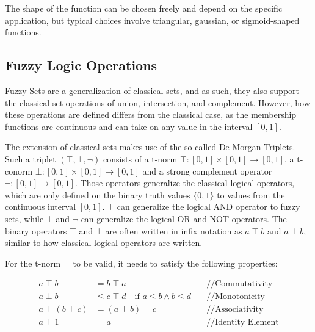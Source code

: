 The shape of the function can be chosen freely and depend on the specific application, but typical choices involve triangular, gaussian, or sigmoid-shaped functions.



\subsection{Fuzzy Logic Operations}

Fuzzy Sets are a generalization of classical sets, and as such, they also support the classical set operations of union, intersection, and complement. However, how these operations are defined differs from the classical case, as the membership functions are continuous and can take on any value in the interval $[0, 1]$.

The extension of classical sets makes use of the so-called De Morgan Triplets. Such a triplet $(\top, \bot, \neg)$ consists of a t-norm $\top : [0, 1] \times [0, 1] \rightarrow [0, 1]$, a t-conorm $\bot : [0, 1] \times [0, 1] \rightarrow [0, 1]$ and a strong complement operator $\neg : [0, 1] \rightarrow [0, 1]$. Those operators generalize the classical logical operators, which are only defined on the binary truth values $\{0, 1\}$ to values from the continuous interval $[0, 1]$. $\top$ can generalize the logical AND operator to fuzzy sets, while $\bot$  and $\neg$ can generalize the logical OR and NOT operators. The binary operators $\top$ and $\bot$ are often written in infix notation as $a \; \top \; b$ and $a \; \bot \; b$, similar to how classical logical operators are written.


For the t-norm $\top$ to be valid, it needs to satisfy the following properties:

\begin{align*}
      a \; \top \; b                & = b \; \top \; a                                              & \quad \text{//Commutativity}    \\
      a \; \bot \; b                & \leq c \; \top \; d  \quad \text{if }  a\leq b \land b \leq d & \quad \text{//Monotonicity}     \\
      a \; \top \; (b \; \top \; c) & = (a \; \top \; b) \; \top \; c                               & \quad \text{//Associativity}    \\
      a \; \top \; 1                & = a                                                           & \quad \text{//Identity Element}
\end{align*}

